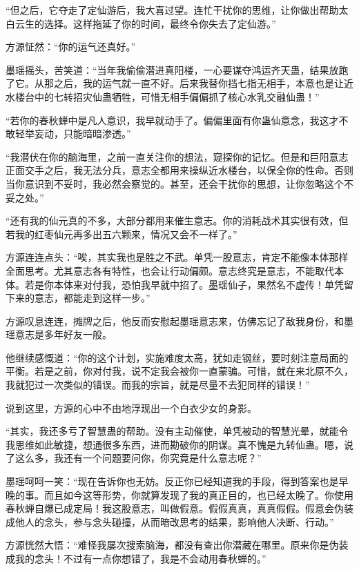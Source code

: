 \begin{this_body}
“但之后，它夺走了定仙游后，我大喜过望。连忙干扰你的思维，让你做出帮助太白云生的选择。这样拖延了你的时间，最终令你失去了定仙游。”

方源怔然：“你的运气还真好。”

墨瑶摇头，苦笑道：“当年我偷偷潜进真阳楼，一心要谋夺鸿运齐天蛊，结果放跑了它。从那之后，我的运气就一直不好。后来我替你挡七指无相手，本意也是让近水楼台中的七转招灾仙蛊牺牲，可惜无相手偏偏抓了核心水乳交融仙蛊！”

“若你的春秋蝉中是凡人意识，我早就动手了。偏偏里面有你蛊仙意念，我这才不敢轻举妄动，只能暗暗渗透。”

“我潜伏在你的脑海里，之前一直关注你的想法，窥探你的记忆。但是和巨阳意志正面交手之后，我无法分兵，意志全都用来操纵近水楼台，以保全你的性命。否则当你意识到不妥时，我必然会察觉的。甚至，还会干扰你的思想，让你忽略这个不妥之处。”

“还有我的仙元真的不多，大部分都用来催生意志。你的消耗战术其实很有效，但若我的红枣仙元再多出五六颗来，情况又会不一样了。”

方源连连点头：“唉，其实我也是胜之不武。单凭一股意志，肯定不能像本体那样全面思考。尤其意志各有特性，也会让行动偏颇。意志终究是意志，不能取代本体。若是你本体来对付我，恐怕我早就中招了。墨瑶仙子，果然名不虚传！单凭留下来的意志，都能走到这样一步。”

方源叹息连连，摊牌之后，他反而安慰起墨瑶意志来，仿佛忘记了敌我身份，和墨瑶意志是多年好友一般。

他继续感慨道：“你的这个计划，实施难度太高，犹如走钢丝，要时刻注意局面的平衡。若是之前，你对付我，说不定我会被你一直蒙骗。可惜，就在来北原不久，我就犯过一次类似的错误。而我的宗旨，就是尽量不去犯同样的错误！”

说到这里，方源的心中不由地浮现出一个白衣少女的身影。

“其实，我还多亏了智慧蛊的帮助。没有主动催使，单凭被动的智慧光晕，就能令我思维如此敏捷，想通很多东西，进而勘破你的阴谋。真不愧是九转仙蛊。嗯，说了这么多，我还有一个问题要问你，你究竟是什么意志呢？”

墨瑶呵呵一笑：“现在告诉你也无妨。反正你已经知道我的手段，得到答案也是早晚的事。而且如今这等形势，你就算发现了我的真正目的，也已经太晚了。你使用春秋蝉自爆已成定局！我这股意志，叫做假意。假假真真，真真假假。假意会伪装成他人的念头，参与念头碰撞，从而暗改思考的结果，影响他人决断、行动。”

方源恍然大悟：“难怪我屡次搜索脑海，都没有查出你潜藏在哪里。原来你是伪装成我的念头！不过有一点你想错了，我是不会动用春秋蝉的。”


\end{this_body}
